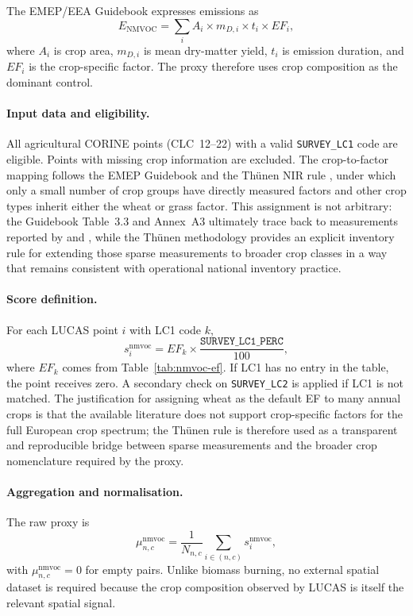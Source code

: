 The EMEP/EEA Guidebook \cite{EMEP_EEA} expresses emissions as
\begin{equation}
  E_{\mathrm{NMVOC}} = \sum_i A_i \times m_{D,i} \times t_i \times EF_i,
  \label{eq:emep-nmvoc}
\end{equation}
where $A_i$ is crop area, $m_{D,i}$ is mean dry-matter yield, $t_i$ is
emission duration, and $EF_i$ is the crop-specific factor. The proxy
therefore uses crop composition as the dominant control.

\paragraph{Input data and eligibility.}
All agricultural CORINE points (CLC~12--22) with a valid
\texttt{SURVEY\_LC1} code are eligible. Points with missing crop
information are excluded. The crop-to-factor mapping follows the EMEP
Guidebook and the Th\"unen NIR rule \citep{thuenen_nmvoc}, under which
only a small number of crop groups have directly measured factors and
other crop types inherit either the wheat or grass factor. This
assignment is not arbitrary: the Guidebook Table~3.3 and Annex~A3
ultimately trace back to measurements reported by \citet{konig1995} and
\citet{lamb1993}, while the Th\"unen methodology provides an explicit
inventory rule for extending those sparse measurements to broader crop
classes in a way that remains consistent with operational national
inventory practice.

\paragraph{Score definition.}
For each LUCAS point $i$ with LC1 code $k$,
\begin{equation}
  s_i^{\mathrm{nmvoc}} =
  EF_k \times \frac{\texttt{SURVEY\_LC1\_PERC}}{100},
  \label{eq:nmvoc-point}
\end{equation}
where $EF_k$ comes from Table~\ref{tab:nmvoc-ef}. If LC1 has no entry
in the table, the point receives zero. A secondary check on
\texttt{SURVEY\_LC2} is applied if LC1 is not matched. The justification
for assigning wheat as the default EF to many annual crops is that the
available literature does not support crop-specific factors for the full
European crop spectrum; the Th\"unen rule is therefore used as a
transparent and reproducible bridge between sparse measurements and the
broader crop nomenclature required by the proxy.

\paragraph{Aggregation and normalisation.}
The raw proxy is
\begin{equation}
  \mu_{n,c}^{\mathrm{nmvoc}} =
  \frac{1}{N_{n,c}} \sum_{i \in (n,c)} s_i^{\mathrm{nmvoc}},
\end{equation}
with $\mu_{n,c}^{\mathrm{nmvoc}}=0$ for empty pairs. Unlike biomass
burning, no external spatial dataset is required because the crop
composition observed by LUCAS is itself the relevant spatial signal.


